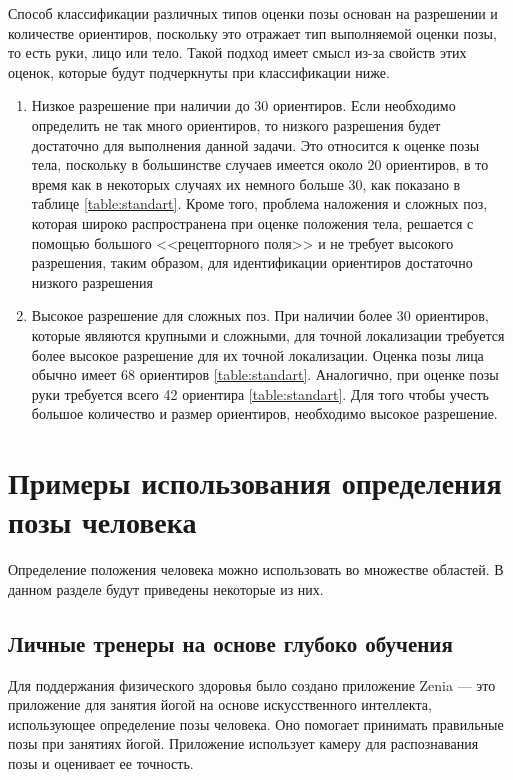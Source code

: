 Способ классификации различных типов оценки позы основан на разрешении и количестве ориентиров, поскольку это отражает тип выполняемой оценки позы, то есть руки, лицо или тело.
Такой подход имеет смысл из-за свойств этих оценок, которые будут подчеркнуты при классификации ниже.

\begin{enumerate}[label=\arabic*)]

\item Низкое разрешение при наличии до 30 ориентиров. Если необходимо определить не так много ориентиров, то низкого разрешения будет достаточно для выполнения данной задачи. 
Это относится к оценке позы тела, поскольку в большинстве случаев имеется около 20 ориентиров, в то время как в некоторых случаях их немного больше 30, как показано в таблице \ref{table:standart}.
Кроме того, проблема наложения и сложных поз, которая широко распространена при оценке положения тела, решается с помощью большого <<рецепторного поля>> и не требует высокого разрешения, таким образом, для идентификации ориентиров достаточно низкого разрешения

\item Высокое разрешение для сложных поз.
При наличии более 30 ориентиров, которые являются крупными и сложными, для точной локализации требуется более высокое разрешение для их точной локализации.
Оценка позы лица обычно имеет 68 ориентиров \ref{table:standart}. Аналогично, при оценке позы руки требуется всего 42 ориентира \ref{table:standart}. Для того чтобы учесть большое количество и размер ориентиров, необходимо высокое разрешение.  

\end{enumerate}


\section{Примеры использования определения позы человека}

Определение положения человека можно использовать во множестве областей. В данном разделе будут приведены некоторые из них.

\subsection{Личные тренеры на основе глубоко обучения}

Для поддержания физического здоровья было создано приложение Zenia \cite{Zenia} --- это приложение для занятия йогой на основе искусственного интеллекта, использующее определение позы человека.
Оно помогает принимать правильные позы при занятиях йогой.
Приложение использует камеру для распознавания позы и оценивает ее точность.

